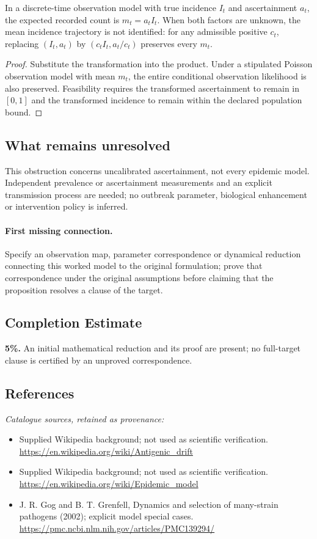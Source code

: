 \documentclass[11pt]{article}
\begin{document}
\begin{proposition}
In a discrete-time observation model with true incidence $I_t$ and ascertainment $a_t$, the expected recorded count is $m_t=a_tI_t$. When both factors are unknown, the mean incidence trajectory is not identified: for any admissible positive $c_t$, replacing $(I_t,a_t)$ by $(c_tI_t,a_t/c_t)$ preserves every $m_t$.
\end{proposition}
\begin{proof}
Substitute the transformation into the product. Under a stipulated Poisson observation model with mean $m_t$, the entire conditional observation likelihood is also preserved. Feasibility requires the transformed ascertainment to remain in $[0,1]$ and the transformed incidence to remain within the declared population bound.
\end{proof}
\subsection{What remains unresolved}
This obstruction concerns uncalibrated ascertainment, not every epidemic model. Independent prevalence or ascertainment measurements and an explicit transmission process are needed; no outbreak parameter, biological enhancement or intervention policy is inferred.
\paragraph{First missing connection.} Specify an observation map, parameter correspondence or dynamical reduction connecting this worked model to the original formulation; prove that correspondence under the original assumptions before claiming that the proposition resolves a clause of the target.
\subsection{Completion Estimate}
\textbf{5\%.} An initial mathematical reduction and its proof are present; no full-target clause is certified by an unproved correspondence.
\subsection{References}
\noindent\emph{Catalogue sources, retained as provenance:}
\begin{itemize}
\item Supplied Wikipedia background; not used as scientific verification. \url{https://en.wikipedia.org/wiki/Antigenic_drift}
\item Supplied Wikipedia background; not used as scientific verification. \url{https://en.wikipedia.org/wiki/Epidemic_model}
\item J. R. Gog and B. T. Grenfell, Dynamics and selection of many-strain pathogens (2002); explicit model special cases. \url{https://pmc.ncbi.nlm.nih.gov/articles/PMC139294/}
\end{itemize}
\end{document}
